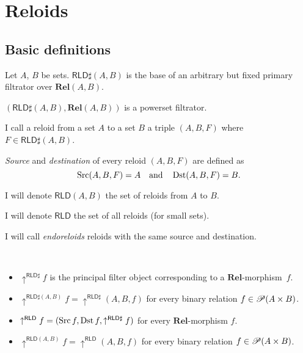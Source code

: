 
\chapter{Reloids}


\section{Basic definitions}

\begin{defn}
Let $A$, $B$ be sets.
$\mathsf{RLD}\sharp(A,B)$ is the base of an arbitrary but fixed primary filtrator over $\mathbf{Rel}(A,B)$.
\end{defn}

\begin{obvious}
$(\mathsf{RLD}\sharp(A,B),\mathbf{Rel}(A,B))$ is a powerset filtrator.
\end{obvious}

\begin{defn}
I call a reloid from a set $A$ to a set $B$ a triple
$(A,B,F)$ where $F\in\mathsf{RLD}\sharp(A,B)$.
\end{defn}

\begin{defn}
\emph{Source} and
\emph{destination} of every reloid $(A,B,F)$ are defined as
\[
\operatorname{Src}(A,B,F)=A\quad\text{and}\quad\operatorname{Dst}(A,B,F)=B.
\]

\end{defn}
I will denote $\mathsf{RLD}(A,B)$ the set of reloids from $A$ to
$B$.

I will denote $\mathsf{RLD}$ the set of all reloids (for small sets).

\begin{defn}
I will call \emph{endoreloids} reloids with the
same source and destination.
\end{defn}

\begin{defn}
~
\begin{itemize}
\item $\uparrow^{\mathsf{RLD}\sharp}f$ is the principal filter object corresponding to a $\mathbf{Rel}$-morphism~$f$.
\item $\uparrow^{\mathsf{RLD}\sharp(A,B)} f=\uparrow^{\mathsf{RLD}\sharp}(A,B,f)$ for every binary relation $f\in\mathscr{P}(A\times B)$.
\item $\uparrow^{\mathsf{RLD}}f=(\operatorname{Src} f,\operatorname{Dst} f,\uparrow^{\mathsf{RLD}\sharp}f)$
for every $\mathbf{Rel}$-morphism $f$.
\item $\uparrow^{\mathsf{RLD}(A,B)}f=\uparrow^{\mathsf{RLD}}(A,B,f)$ for every binary relation $f\in\mathscr{P}(A\times B)$.
\end{itemize}
\end{defn}

